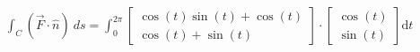 \documentclass[preview]{standalone}
\begin{document}
\begin{align*}
\int_C (\vec{F} \cdot \hat{n}) \ ds = \int_0^{2\pi} \begin{bmatrix}\cos(t)\sin(t) + \cos(t) \\ \cos(t) + \sin(t) \end{bmatrix} \cdot \begin{bmatrix}\cos(t) \\ \sin(t)\end{bmatrix} \text{d}t
\end{align*}
\end{document}
